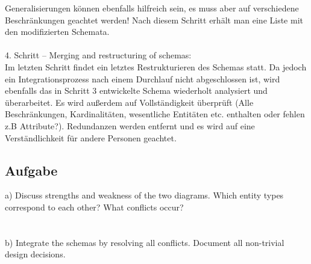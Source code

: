 \documentclass[11pt,a4paper,DIV=9]{scrartcl}
\newcounter{temp}
\newcommand{\aufgabe}[1]{
  \setcounter{temp}{\value{subsection}}
  \setcounter{subsection}{#1}
  \addtocounter{subsection}{-1}
  \subsection{Aufgabe}
  \setcounter{subsection}{\value{temp}}
}
\begin{document}
Generalisierungen k\"onnen ebenfalls hilfreich sein, es muss aber auf verschiedene Beschr\"ankungen geachtet werden!
Nach diesem Schritt erh\"alt man eine Liste mit den modifizierten Schemata.
\\\\ 4. Schritt -- Merging and restructuring of schemas: \\
Im letzten Schritt findet ein letztes Restrukturieren des Schemas statt. Da jedoch ein Integrationsprozess nach einem Durchlauf nicht abgeschlossen ist, wird ebenfalls das in Schritt 3 entwickelte Schema wiederholt analysiert und \"uberarbeitet. Es wird au{\ss}erdem auf Vollst\"andigkeit \"uberpr\"uft (Alle Beschr\"ankungen, Kardinalit\"aten, wesentliche Entit\"aten etc. enthalten oder fehlen z.B Attribute?). Redundanzen werden entfernt und es wird auf eine Verst\"andlichkeit f\"ur andere Personen geachtet.
\aufgabe{3}
a) Discuss strengths and weakness of the two diagrams. Which entity types correspond to each other? What conflicts occur? \\
\\\\
b) Integrate the schemas by resolving all conflicts. Document all non-trivial design decisions. \\
\end{document}
